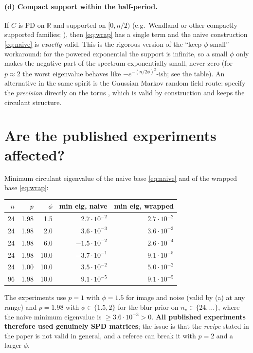 \documentclass[11pt]{article}
\newcommand{\R}{\mathbb{R}}
\begin{document}
\paragraph{(d) Compact support within the half-period.}
If $C$ is PD on $\R$ and supported on $[0, n/2)$ (e.g.\ Wendland or other
compactly supported families; \citealp{Wendland1995, Gneiting2002}), then
\eqref{eq:wrap} has a single term and the naive construction \eqref{eq:naive}
is \emph{exactly} valid. This is the rigorous version of the ``keep $\phi$
small'' workaround: for the powered exponential the support is infinite, so a
small $\phi$ only makes the negative part of the spectrum exponentially
small, never zero (for $p \approx 2$ the worst eigenvalue behaves like
$-e^{-(n/2\phi)^2}$-ish; see the table). An alternative in the same spirit is
the Gaussian Markov random field route: specify the \emph{precision} directly
on the torus \citep{RueHeld2005}, which is valid by construction and keeps
the circulant structure.

\section{Are the published experiments affected?}

Minimum circulant eigenvalue of the naive base \eqref{eq:naive} and of the
wrapped base \eqref{eq:wrap}:

\begin{center}
\begin{tabular}{rrr rr}
\toprule
$n$ & $p$ & $\phi$ & min eig, naive & min eig, wrapped \\
\midrule
24 & 1.98 & 1.5  & $2.7\cdot 10^{-2}$ & $2.7\cdot 10^{-2}$ \\
24 & 1.98 & 2.0  & $3.6\cdot 10^{-3}$ & $3.6\cdot 10^{-3}$ \\
24 & 1.98 & 6.0  & $-1.5\cdot 10^{-2}$ & $2.6\cdot 10^{-4}$ \\
24 & 1.98 & 10.0 & $-3.7\cdot 10^{-1}$ & $9.1\cdot 10^{-5}$ \\
24 & 1.00 & 10.0 & $3.5\cdot 10^{-2}$ & $5.0\cdot 10^{-2}$ \\
96 & 1.98 & 10.0 & $9.1\cdot 10^{-5}$ & $9.1\cdot 10^{-5}$ \\
\bottomrule
\end{tabular}
\end{center}

The experiments use $p = 1$ with $\phi = 1.5$ for image and noise (valid by
(a) at any range) and $p = 1.98$ with $\phi \in \{1.5, 2\}$ for the blur
prior on $n_v \in \{24, \dots\}$, where the naive minimum eigenvalue is
$\ge 3.6\cdot 10^{-3} > 0$. \textbf{All published experiments therefore used
genuinely SPD matrices}; the issue is that the \emph{recipe} stated in the
paper is not valid in general, and a referee can break it with $p=2$ and a
larger $\phi$.
\end{document}

